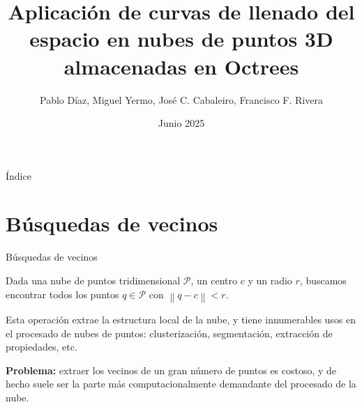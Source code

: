 \documentclass[aspectratio=169]{beamer}
\title{Aplicación de curvas de llenado del espacio en nubes de puntos 3D almacenadas en Octrees}
\author{Pablo Díaz, Miguel Yermo, José C. Cabaleiro, Francisco F. Rivera}
\date{Junio 2025}
\def\toctitle{Índice}
\begin{document}
\begin{frame}[plain]%
    \titlepage%
    
\end{frame}
  
\begin{frame}[plain]{\toctitle}
    \tableofcontents
\end{frame}
\setcounter{framenumber}{0} %

\section{Búsquedas de vecinos}

\begin{frame}{Búsquedas de vecinos}

Dada una nube de puntos tridimensional $\mathcal{P}$, un centro $c$ y un radio $r$, buscamos encontrar todos los puntos $q \in \mathcal{P}$ con $\left\lVert q-c \right\rVert < r$.

Esta operación extrae la estructura local de la nube, y tiene innumerables usos en el procesado de nubes de puntos: clusterización, segmentación, extracción de propiedades, etc.
\vspace{2em}

\textbf{Problema:} extraer los vecinos de un gran número de puntos es costoso, y de hecho suele ser la parte más computacionalmente demandante del procesado de la nube.
\end{frame}
\end{document}
